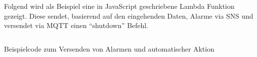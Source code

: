 \label{anhang:echtzeit-codesample}
Folgend wird als Beispiel eine in JavaScript geschriebene Lambda Funktion gezeigt. Diese sendet, basierend auf den eingehenden Daten, Alarme via \ac{SNS} und versendet via \ac{MQTT} einen \enquote{shutdown} Befehl.
\begin{listing}[H]
\inputminted[frame=lines,breaklines=true]{javascript}{code/sample-realtime-lambda.js}
\caption{Beispielcode zum Versenden von Alarmen und automatischer Aktion}
\label{listing:sample-realtime-alarm-action}
\end{listing}